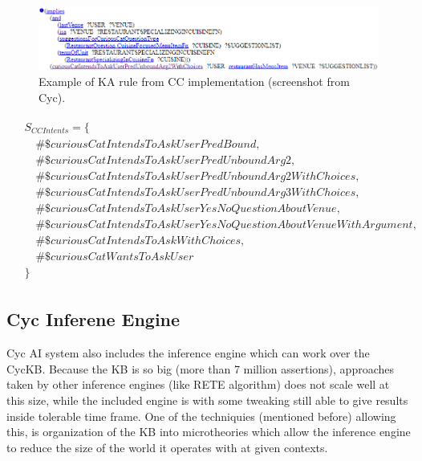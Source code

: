\begin{figure}[h]
	\centering
		\includegraphics[width=1\textwidth]{figures/kaRule.png}
	\caption{Example of KA rule from CC implementation (screenshot from Cyc).}
	\label{fig:kaRuleImpl}
\end{figure}

\begin{equation}\label{as:cycCCAssertions}
\begin{gathered}
\begin{aligned}
&S_{CC Intents}=\{\\
&\quad\#\$curiousCatIntendsToAskUserPredBound,\\
&\quad\#\$curiousCatIntendsToAskUserPredUnboundArg2,\\
&\quad\#\$curiousCatIntendsToAskUserPredUnboundArg2WithChoices,\\
&\quad\#\$curiousCatIntendsToAskUserPredUnboundArg3WithChoices,\\
&\quad\#\$curiousCatIntendsToAskUserYesNoQuestionAboutVenue,\\
&\quad\#\$curiousCatIntendsToAskUserYesNoQuestionAboutVenueWithArgument,\\
&\quad\#\$curiousCatIntendsToAskWithChoices,\\
&\quad\#\$curiousCatWantsToAskUser\\
&\}
\end{aligned}
\end{gathered}
\end{equation}

\subsection{Cyc Inferene Engine}
\label{section:cycinference}
Cyc AI system also includes the inference engine which can work over the CycKB.
Because the KB is so big (more than 7 million assertions), approaches taken
by other inference engines (like RETE algorithm) does not scale well at this
size, while the included engine is with some tweaking still able to give 
results inside tolerable time frame. One of the techniquies (mentioned before)
allowing this, is organization of the KB into microtheories which allow the 
inference engine to reduce the size of the world it operates with at given
contexts.

